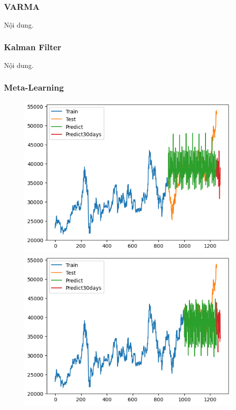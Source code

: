 \subsubsection{VARMA}
Nội dung.


\subsubsection{Kalman Filter}
Nội dung.




\subsubsection{Meta-Learning}
\begin{figure}[H]
    \centering
    \begin{minipage}{0.15\textwidth}
    \centering
    \includegraphics[width=1\textwidth]{resources/chapter-5/result/BIDV_ML_7_3.png}
    \end{minipage}
    \hfill
    \begin{minipage}{0.15\textwidth}
    \centering
    \includegraphics[width=1\textwidth]{resources/chapter-5/result/BIDV_ML_8_2.png}

\end{minipage}
\end{figure}
